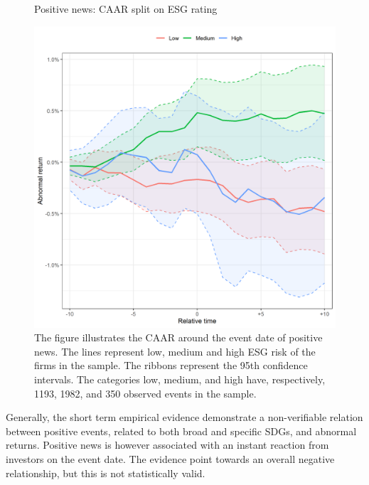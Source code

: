 \begin{figure} [H]
    \centering
    \caption{Positive news: CAAR split on ESG rating}
    \includegraphics[scale=0.6]{Projekt/1.Figures analysis/ST_positive_ESG.png}
     \caption*{\footnotesize The figure illustrates the CAAR around the event date of positive news. The lines represent low, medium and high ESG risk of the firms in the sample. The ribbons represent the 95th confidence intervals. The categories low, medium, and high have, respectively, 1193, 1982, and 350 observed events in the sample.  }
    \label{fig:ST_pos_ESG}
\end{figure} 




Generally, the short term empirical evidence demonstrate a non-verifiable relation between positive events, related to both broad and specific SDGs, and abnormal returns. Positive news is however associated with an instant reaction from investors on the event date. The evidence point towards an overall negative relationship, but this is not statistically valid.  




